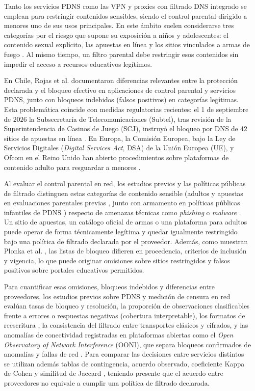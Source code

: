 \documentclass[10pt,a4paper]{article}
\begin{document}
Tanto los servicios PDNS como las VPN y proxies con filtrado DNS integrado se emplean para restringir contenidos sensibles, siendo el control parental dirigido a menores uno de sus usos principales. En este ámbito suelen considerarse tres categorías por el riesgo que supone su exposición a niños y adolescentes: el contenido sexual explícito, las apuestas en línea y los sitios vinculados a armas de fuego \cite{rojas2025,dns4eupolitica}. Al mismo tiempo, un filtro parental debe restringir esos contenidos sin impedir el acceso a recursos educativos legítimos.

En Chile, Rojas et al. \cite{rojas2025,rojas2025ieee} documentaron diferencias relevantes entre la protección declarada y el bloqueo efectivo en aplicaciones de control parental y servicios PDNS, junto con bloqueos indebidos (falsos positivos) en categorías legítimas. Esta problemática coincide con medidas regulatorias recientes: el 1 de septiembre de 2026 la Subsecretaría de Telecomunicaciones (Subtel), tras revisión de la Superintendencia de Casinos de Juego (SCJ), instruyó el bloqueo por DNS de 42 sitios de apuestas en línea \cite{subtel2026apuestas}. En Europa, la Comisión Europea, bajo la Ley de Servicios Digitales (\emph{Digital Services Act}, DSA) de la Unión Europea (UE), y Ofcom en el Reino Unido han abierto procedimientos sobre plataformas de contenido adulto para resguardar a menores \cite{ec2025adult,ofcomavs}.

Al evaluar el control parental en red, los estudios previos y las políticas públicas de filtrado distinguen estas categorías de contenido sensible (adultos y apuestas en evaluaciones parentales previas \cite{rojas2025,rojas2025ieee}, junto con armamento en políticas públicas infantiles de PDNS \cite{dns4eupolitica}) respecto de amenazas técnicas como \emph{phishing} o \emph{malware} \cite{liu2024,plonka2025,cloudflare}. Un sitio de apuestas, un catálogo oficial de armas o una plataforma para adultos puede operar de forma técnicamente legítima y quedar igualmente restringido bajo una política de filtrado declarada por el proveedor. Además, como muestran Plonka et al. \cite{plonka2025}, las listas de bloqueo difieren en procedencia, criterios de inclusión y vigencia, lo que puede originar omisiones sobre sitios restringidos y falsos positivos sobre portales educativos permitidos.

Para cuantificar esas omisiones, bloqueos indebidos y diferencias entre proveedores, los estudios previos sobre PDNS y medición de censura en red evalúan tasas de bloqueo y resolución, la proporción de observaciones clasificables frente a errores o respuestas negativas (cobertura interpretable), los formatos de reescritura \cite{liu2024}, la consistencia del filtrado entre transportes clásicos y cifrados, y las anomalías de conectividad registradas en plataformas abiertas como el \emph{Open Observatory of Network Interference} (OONI), que separa bloqueos confirmados de anomalías y fallas de red \cite{ooni2012,ooni}. Para comparar las decisiones entre servicios distintos se utilizan además tablas de contingencia, acuerdo observado, coeficiente Kappa de Cohen \cite{cohen1960} y similitud de Jaccard \cite{kosub2016}, teniendo presente que el acuerdo entre proveedores no equivale a cumplir una política de filtrado declarada.
\end{document}
